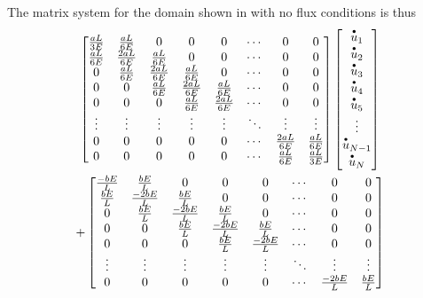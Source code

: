 The matrix system for the domain shown in  with no flux conditions is thus
\begin{multline}
  \begin{bmatrix}
    \frac{aL}{3E} & \frac{aL}{6E} & 0 & 0 & 0 & \cdots & 0 & 0 \\
    \frac{aL}{6E} & \frac{2aL}{6E} &  \frac{aL}{6E} & 0 & 0 & \cdots & 0 & 0 \\
    0 & \frac{aL}{6E} & \frac{2aL}{6E} &  \frac{aL}{6E} & 0 & \cdots & 0 & 0 \\
    0 & 0 & \frac{aL}{6E} & \frac{2aL}{6E} &  \frac{aL}{6E} & \cdots & 0 & 0 \\
    0 & 0 & 0 & \frac{aL}{6E} & \frac{2aL}{6E} & \cdots & 0 & 0 \\
    \vdots & \vdots & \vdots & \vdots & \vdots & \ddots & \vdots & \vdots \\
    0 & 0 & 0 & 0 & 0 & \cdots & \frac{2aL}{6E} & \frac{aL}{6E} \\
    0 & 0 & 0 & 0 & 0 & \cdots & \frac{aL}{6E} & \frac{aL}{3E} \\
  \end{bmatrix} \begin{bmatrix}
     \stackrel{\scriptscriptstyle \bullet}{u} _{1} \\
     \stackrel{\scriptscriptstyle \bullet}{u} _{2} \\
     \stackrel{\scriptscriptstyle \bullet}{u} _{3} \\
     \stackrel{\scriptscriptstyle \bullet}{u} _{4} \\
     \stackrel{\scriptscriptstyle \bullet}{u} _{5} \\
    \vdots \\
     \stackrel{\scriptscriptstyle \bullet}{u} _{N-1} \\
     \stackrel{\scriptscriptstyle \bullet}{u} _{N} \\
  \end{bmatrix} \\
  + \begin{bmatrix}
    \frac{-bE}{L} & \frac{bE}{L} & 0 & 0 & 0 & \cdots & 0 & 0 \\
    \frac{bE}{L} & \frac{-2bE}{L} &  \frac{bE}{L} & 0 & 0 & \cdots & 0 & 0 \\
    0 & \frac{bE}{L} & \frac{-2bE}{L} &  \frac{bE}{L} & 0 & \cdots & 0 & 0 \\
    0 & 0 & \frac{bE}{L} & \frac{-2bE}{L} &  \frac{bE}{L} & \cdots & 0 & 0 \\
    0 & 0 & 0 & \frac{bE}{L} & \frac{-2bE}{L} & \cdots & 0 & 0 \\
    \vdots & \vdots & \vdots & \vdots & \vdots & \ddots & \vdots & \vdots \\
    0 & 0 & 0 & 0 & 0 & \cdots & \frac{-2bE}{L} & \frac{bE}{L} \\

\end{bmatrix}
\end{multline}
